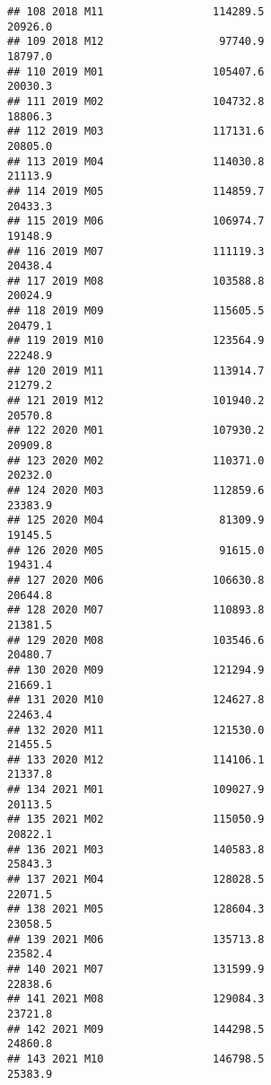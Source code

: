 \documentclass[
]{article}
\begin{document}
\begin{verbatim}
## 108 2018 M11                 114289.5                         20926.0
## 109 2018 M12                  97740.9                         18797.0
## 110 2019 M01                 105407.6                         20030.3
## 111 2019 M02                 104732.8                         18806.3
## 112 2019 M03                 117131.6                         20805.0
## 113 2019 M04                 114030.8                         21113.9
## 114 2019 M05                 114859.7                         20433.3
## 115 2019 M06                 106974.7                         19148.9
## 116 2019 M07                 111119.3                         20438.4
## 117 2019 M08                 103588.8                         20024.9
## 118 2019 M09                 115605.5                         20479.1
## 119 2019 M10                 123564.9                         22248.9
## 120 2019 M11                 113914.7                         21279.2
## 121 2019 M12                 101940.2                         20570.8
## 122 2020 M01                 107930.2                         20909.8
## 123 2020 M02                 110371.0                         20232.0
## 124 2020 M03                 112859.6                         23383.9
## 125 2020 M04                  81309.9                         19145.5
## 126 2020 M05                  91615.0                         19431.4
## 127 2020 M06                 106630.8                         20644.8
## 128 2020 M07                 110893.8                         21381.5
## 129 2020 M08                 103546.6                         20480.7
## 130 2020 M09                 121294.9                         21669.1
## 131 2020 M10                 124627.8                         22463.4
## 132 2020 M11                 121530.0                         21455.5
## 133 2020 M12                 114106.1                         21337.8
## 134 2021 M01                 109027.9                         20113.5
## 135 2021 M02                 115050.9                         20822.1
## 136 2021 M03                 140583.8                         25843.3
## 137 2021 M04                 128028.5                         22071.5
## 138 2021 M05                 128604.3                         23058.5
## 139 2021 M06                 135713.8                         23582.4
## 140 2021 M07                 131599.9                         22838.6
## 141 2021 M08                 129084.3                         23721.8
## 142 2021 M09                 144298.5                         24860.8
## 143 2021 M10                 146798.5                         25383.9

\end{verbatim}
\end{document}
